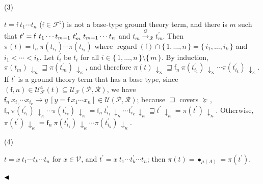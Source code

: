 \documentclass[10pt,a4paper]{amsart}
\begin{document}
 
 
\par\noindent  (3) 
 
$t={\mathsf{f}}\ {{t}_{1}\cdots{t}_{n}}$ ($\mathsf{f}\in\mathcal{F}^{\sharp}$) is not a base-type ground theory term, and there is $m$ such that $t^{\prime}={{{\mathsf{f}}\ {{t}_{1}\cdots{t}_{m-1}}}\ {t_{m}^{\prime}}}\ {\\
{t}_{m+1}\cdots{t}_{n}}$ and $t_{m}\xrightarrow{\scriptscriptstyle\mathcal{Q}}_{\mathcal{R}}t_{m}^{\prime}$. Then $\pi(t)={\mathsf{f}_{n}}\ {\pi(t_{i_{1}})\cdots\pi(t_{i_{k}})}$ where $\operatorname{regard}(\mathsf{f})\cap\{\,1,\ldots,n\,\}=\{\,{i}_{1},\ldots,{i}_{k}\,\}$ and ${i}_{1}<\cdots<{i}_{k}$. Let $t_{i}^{\prime}$ be $t_{i}$ for all $i\in\{\,1,\ldots,n\,\}\setminus\{\,m\,\}$. By induction, $\pi(t_{m})\,{\downarrow}_{\kappa}\sqsupseteq\pi(t_{m}^{\prime})\,{\downarrow}_{\kappa}$, and therefore $\pi(t)\,{\downarrow}_{\kappa}\sqsupseteq{\mathsf{f}_{n}}\ {\pi(t_{i_{1}}^{\prime})\,{\downarrow}_{\kappa}\cdots\pi(t_{i_{k}}^{\prime})\,{\downarrow}_{\kappa}}$. If $t^{\prime}$ is a ground theory term that has a base type, since $(\mathsf{f},n)\in\mathcal{U}_{\mathcal{F}}^{\mathfrak{a}}(t)\subseteq\mathcal{U}_{\mathcal{F}}(\mathcal{P},\mathcal{R})$, we have ${{\mathsf{f}_{n}}\ {x_{i_{1}}\cdots x_{i_{k}}}}\rightarrow{y}\ [y={\mathsf{f}}\ {{x}_{1}\cdots{x}_{n}}]\in\mathcal{U}(\mathcal{P},\mathcal{R})$; because $\sqsupseteq$ covers $\succeq$, ${\mathsf{f}_{n}}\ {\pi(t_{i_{1}}^{\prime})\,{\downarrow}_{\kappa}\cdots\pi(t_{i_{k}}^{\prime})\,{\downarrow}_{\kappa}}={\mathsf{f}_{n}}\ {t_{i_{1}}^{\prime}\,{\downarrow}_{\kappa}\cdots t_{i_{k}}^{\prime}\,{\downarrow}_{\kappa}}\sqsupseteq t^{\prime}\,{\downarrow}_{\kappa}=\pi(t^{\prime})\,{\downarrow}_{\kappa}$. Otherwise, $\pi(t^{\prime})\,{\downarrow}_{\kappa}={\mathsf{f}_{n}}\ {\pi(t_{i_{1}}^{\prime})\,{\downarrow}_{\kappa}\cdots\pi(t_{i_{k}}^{\prime})\,{\downarrow}_{\kappa}}$.\par
 
 
 
\par\noindent  (4) 
 
$t={x}\ {{t}_{1}\cdots{t}_{k}}\cdots t_{n}$ for $x\in\mathcal{V}$, and $t^{\prime}=x\ t_{1}\cdots t_{k}^{\prime}\cdots t_{n}$; then $\pi(t)=\bullet_{\mu(A)}=\pi(t^{\prime})$.\par
 
 
  
$\hfill\blacktriangleleft$\par
 
\end{document}
